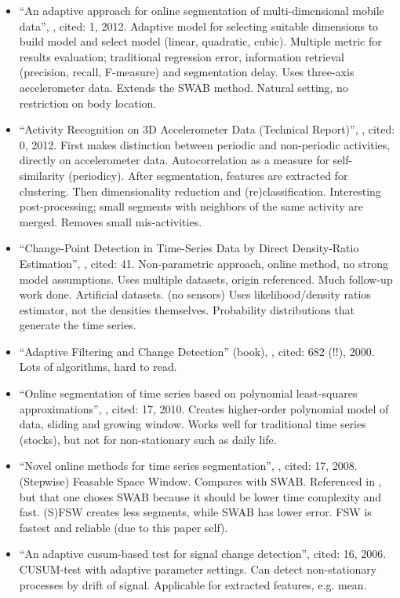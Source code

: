 \begin{itemize}
  \item ``An adaptive approach for online segmentation of multi-dimensional mobile data'', \cite{guo2012adaptive}, cited: 1, 2012. Adaptive model for selecting suitable dimensions to build model and select model (linear, quadratic, cubic). Multiple metric for results evaluation; traditional regression error, information retrieval (precision, recall, F-measure) and segmentation delay. Uses three-axis accelerometer data. Extends the SWAB method. Natural setting, no restriction on body location.
  \item ``Activity Recognition on 3D Accelerometer Data (Technical Report)'', \cite{bernecker2012activity}, cited: 0, 2012. First makes distinction between periodic and non-periodic activities, directly on accelerometer data. Autocorrelation as a measure for self-similarity (periodicy). After segmentation, features are extracted for clustering. Then dimensionality reduction and (re)classification. Interesting post-processing; small segments with neighbors of the same activity are merged. Removes small mis-activities.
  \item ``Change-Point Detection in Time-Series Data by Direct Density-Ratio Estimation'', \cite{kawahara2009change}, cited: 41. Non-parametric approach, online method, no strong model assumptions. Uses multiple datasets, origin referenced. Much follow-up work done. Artificial datasets. (no sensors) Uses likelihood/density ratios estimator, not the densities themselves. Probability distributions that generate the time series.
  \item ``Adaptive Filtering and Change Detection'' (book), \cite{gustafsson2000adaptive}, cited: 682 (!!), 2000. Lots of algorithms, hard to read.
  \item ``Online segmentation of time series based on polynomial least-squares approximations'', \cite{fuchs2010online}, cited: 17, 2010. Creates higher-order polynomial model of data, sliding and growing window. Works well for traditional time series (stocks), but not for non-stationary such as daily life.
  \item ``Novel online methods for time series segmentation'', \cite{liu2008novel}, cited: 17, 2008. (Stepwise) Feasable Space Window. Compares with SWAB. Referenced in \cite{guo2012adaptive}, but that one choses SWAB because it should be lower time complexity and fast. (S)FSW creates less segments, while SWAB has lower error. FSW is fastest and reliable (due to this paper self).
  \item ``An adaptive cusum-based test for signal change detection'', \cite{alippi2006adaptive} cited: 16, 2006. CUSUM-test with adaptive parameter settings. Can detect non-stationary processes by drift of signal. Applicable for extracted features, e.g. mean.
\end{itemize}